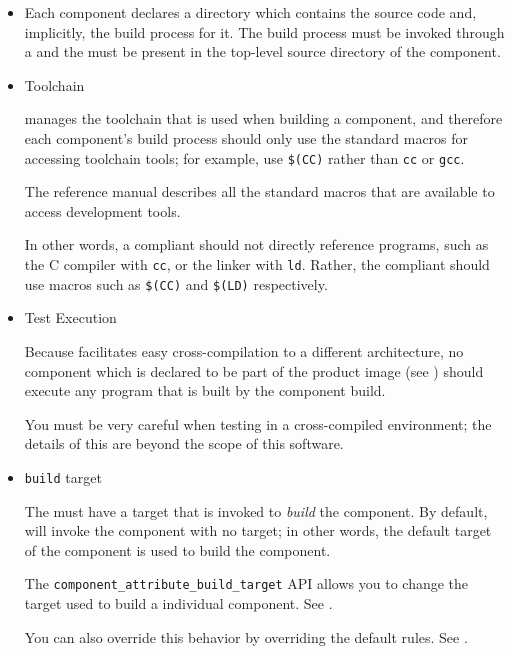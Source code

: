 \begin{itemize}
\item \makefile

  Each component declares a directory which contains the source code
  and, implicitly, the build process for it.  The build process must
  be invoked through a \makefile and the \makefile must be present in
  the top-level source directory of the component.

\item Toolchain

  \lmsbw manages the toolchain that is used when building a component,
  and therefore each component's build process should only use the
  standard macros for accessing toolchain tools; for example, use
  \texttt{\$(CC)} rather than \texttt{cc} or \texttt{gcc}.

  The \gnumake reference manual describes all the standard macros that
  are available to access development tools.

  In other words, a compliant \makefile should not directly reference
  programs, such as the C compiler with \texttt{cc}, or the linker
  with \texttt{ld}.  Rather, the compliant \makefile should use macros
  such as \texttt{\$(CC)} and \texttt{\$(LD)} respectively.

\item Test Execution

  Because \lmsbw facilitates easy cross-compilation to a different
  architecture, no component which is declared to be part of the
  product image (see ) should execute any
  program that is built by the component build.

  You must be very careful when testing in a cross-compiled
  environment; the details of this are beyond the scope of this
  software.

\item \texttt{build} target

  The \makefile must have a target that is invoked to \emph{build} the
  component.  By default, \lmsbw will invoke the component \makefile
  with no target; in other words, the default target of the component
  \makefile is used to build the component.

  The \texttt{component\_attribute\_build\_target} API allows you to
  change the target used to build a individual component.  See
  .

  You can also override this behavior by overriding the default
  rules.  See .


\end{itemize}
